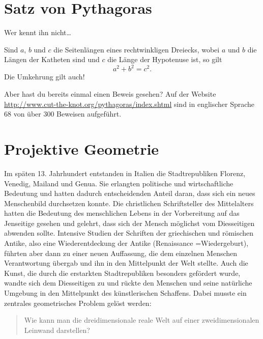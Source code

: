 \documentclass[%
11pt,%
twoside,%
titlepage,%
german,%
headsepline%
]{scrartcl}
\begin{document}


\clearpage

\section{Satz von Pythagoras}

Wer kennt ihn nicht\dots 

\begin{csatz}{}
Sind $a$, $b$ und $c$ die Seitenlängen eines rechtwinkligen Dreiecks, wobei $a$ und $b$ die Längen der Katheten sind und $c$ die Länge der Hypotenuse ist, so gilt 
$$a^2+b^2=c^2.$$
Die Umkehrung gilt auch!
\end{csatz}

Aber hast du bereits einmal einen Beweis gesehen? Auf der Website \url{http://www.cut-the-knot.org/pythagoras/index.shtml} sind in englischer Sprache $68$ von \"uber $300$ Beweisen aufgef\"uhrt.

\clearpage

\section{Projektive Geometrie}
Im sp\"aten 13. Jahrhundert entstanden in Italien die Stadtrepubliken Florenz, Venedig, Mailand und Genua. Sie erlangten politische und wirtschaftliche Bedeutung und hatten dadurch entscheidenden Anteil daran, dass sich ein neues Menschenbild durchsetzen konnte. Die christlichen Schriftsteller des Mittelalters hatten die Bedeutung des menschlichen Lebens in der Vorbereitung auf das Jenseitige gesehen und gelehrt, dass sich der Mensch m\"oglichst vom Diesseitigen abwenden sollte. Intensive Studien der Schriften der griechischen und r\"omischen Antike, also eine Wiederentdeckung der Antike (Renaissance =Wiedergeburt), f\"uhrten aber dann zu einer neuen Auffassung, die dem einzelnen Menschen Verantwortung \"ubergab und ihn in den Mittelpunkt der Welt stellte. Auch die Kunst, die durch die erstarkten Stadtrepubliken besonders gef\"ordert wurde, wandte sich dem Diesseitigen zu und r\"uckte den Menschen und seine nat\"urliche Umgebung in den Mittelpunkt des k\"unstlerischen Schaffens. Dabei musste ein zentrales geometrisches Problem gel\"ost werden:

\begin{quote}
Wie kann man die dreidimensionale reale Welt auf einer zweidimensionalen Leinwand darstellen?
\end{quote}
\end{document}
